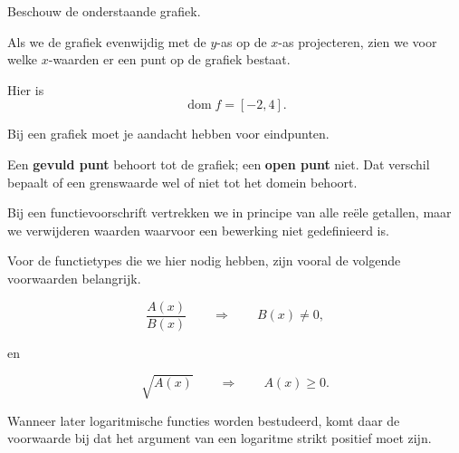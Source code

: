 \documentclass{ximera}
\begin{document}
\begin{voorbeeld}

Beschouw de onderstaande grafiek.

\begin{center}
\end{center}

Als we de grafiek evenwijdig met de \(y\)-as op de \(x\)-as projecteren,
zien we voor welke \(x\)-waarden er een punt op de grafiek bestaat.

Hier is
\[
\boxed{\operatorname{dom}f=[-2,4].}
\]
\end{voorbeeld}

\begin{opmerking}
Bij een grafiek moet je aandacht hebben voor eindpunten.

Een \textbf{gevuld punt} behoort tot de grafiek; een \textbf{open punt}
niet. Dat verschil bepaalt of een grenswaarde wel of niet tot het domein behoort.
\end{opmerking}



Bij een functievoorschrift vertrekken we in principe van alle reële getallen,
maar we verwijderen waarden waarvoor een bewerking niet gedefinieerd is.

Voor de functietypes die we hier nodig hebben, zijn vooral de volgende
voorwaarden belangrijk.

\begin{eigenschap}
\[
\frac{A(x)}{B(x)}
\qquad\Longrightarrow\qquad
B(x)\neq 0,
\]

en

\[
\sqrt{A(x)}
\qquad\Longrightarrow\qquad
A(x)\geq 0.
\]

Wanneer later logaritmische functies worden bestudeerd, komt daar de voorwaarde
bij dat het argument van een logaritme strikt positief moet zijn.
\end{eigenschap}
\end{document}
